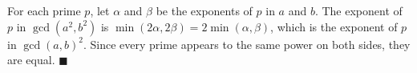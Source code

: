 For each prime $p$, let $\alpha$ and $\beta$ be the exponents of $p$ in $a$ and $b$. The exponent of $p$ in $\gcd(a^2,b^2)$ is $\min(2\alpha,2\beta)=2\min(\alpha,\beta)$, which is the exponent of $p$ in $\gcd(a,b)^2$. Since every prime appears to the same power on both sides, they are equal. $\blacksquare$
